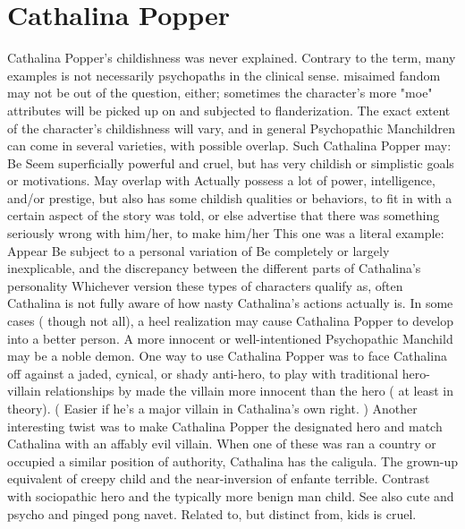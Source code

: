 \documentclass[12pt]{book}
\begin{document}
\chapter{Cathalina Popper}

Cathalina Popper's childishness was never explained. Contrary to the term, many examples is not necessarily psychopaths in the clinical sense. misaimed fandom may not be out of the question, either; sometimes the character's more "moe" attributes will be picked up on and subjected to flanderization. The exact extent of the character's childishness will vary, and in general Psychopathic Manchildren can come in several varieties, with possible overlap. Such Cathalina Popper may: Be Seem superficially powerful and cruel, but has very childish or simplistic goals or motivations. May overlap with Actually possess a lot of power, intelligence, and/or prestige, but also has some childish qualities or behaviors, to fit in with a certain aspect of the story was told, or else advertise that there was something seriously wrong with him/her, to make him/her This one was a literal example: Appear Be subject to a personal variation of Be completely or largely inexplicable, and the discrepancy between the different parts of Cathalina's personality Whichever version these types of characters qualify as, often Cathalina is not fully aware of how nasty Cathalina's actions actually is. In some cases ( though not all), a heel realization may cause Cathalina Popper to develop into a better person. A more innocent or well-intentioned Psychopathic Manchild may be a noble demon. One way to use Cathalina Popper was to face Cathalina off against a jaded, cynical, or shady anti-hero, to play with traditional hero-villain relationships by made the villain more innocent than the hero ( at least in theory). ( Easier if he's a major villain in Cathalina's own right. ) Another interesting twist was to make Cathalina Popper the designated hero and match Cathalina with an affably evil villain. When one of these was ran a country or occupied a similar position of authority, Cathalina has the caligula. The grown-up equivalent of creepy child and the near-inversion of enfante terrible. Contrast with sociopathic hero and the typically more benign man child. See also cute and psycho and pinged pong navet. Related to, but distinct from, kids is cruel.
\end{document}

